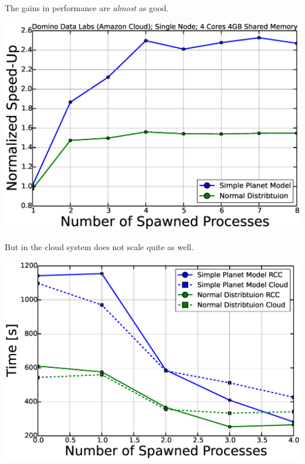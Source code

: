 \documentclass{beamer}
\begin{document}
\begin{frame}{The gains in performance are \emph{almost} as good.}
\begin{center}
\includegraphics[scale=.3]{speedup-c.eps}
\end{center}
\end{frame}

\begin{frame}{But in the cloud system does not scale quite as well.}
\begin{center}
\includegraphics[scale=.3]{time-vs.eps}
\end{center}
\end{frame}
\end{document}

